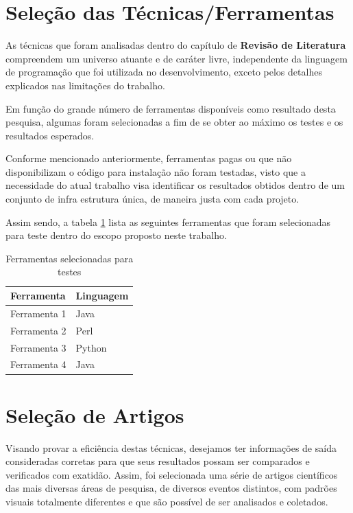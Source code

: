 \section{Seleção das Técnicas/Ferramentas}

As técnicas que foram analisadas dentro do capítulo de \textbf{Revisão de Literatura} compreendem um universo atuante e de caráter livre, independente da linguagem de programação que foi utilizada no desenvolvimento, exceto pelos detalhes explicados nas limitações do trabalho.

Em função do grande número de ferramentas disponíveis como resultado desta pesquisa, algumas foram selecionadas a fim de se obter ao máximo os testes e os resultados esperados.

Conforme mencionado anteriormente, ferramentas pagas ou que não disponibilizam o código para instalação não foram testadas, visto que a necessidade do atual trabalho visa identificar os resultados obtidos dentro de um conjunto de infra estrutura única, de maneira justa com cada projeto.

Assim sendo, a tabela \ref{tab:ferramentas} lista as seguintes ferramentas que foram selecionadas para teste dentro do escopo proposto neste trabalho.


\begin{table}
    \caption{Ferramentas selecionadas para testes}
    \begin{center}
    	\begin{tabular}{|p{6cm}|p{5cm}|}
			\hline \textbf{Ferramenta} & \textbf{Linguagem} \\ 
			\hline Ferramenta 1 & Java\\
			\hline Ferramenta 2 & Perl\\
			\hline Ferramenta 3 & Python\\
			\hline Ferramenta 4 & Java\\
	    	\hline 
    	\end{tabular} 
    \end{center}
  	\label{tab:ferramentas}
\end{table}

\section{Seleção de Artigos}

Visando provar a eficiência destas técnicas, desejamos ter informações de saída consideradas corretas para que seus resultados possam ser comparados e verificados com exatidão. Assim, foi selecionada uma série de artigos científicos das mais diversas áreas de pesquisa, de diversos eventos distintos, com padrões visuais totalmente diferentes e que são possível de ser analisados e coletados.

